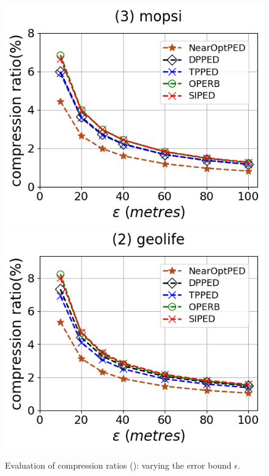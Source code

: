 \begin{figure}[tb!]
	\includegraphics[scale=0.315]{Figures/Exp-PED-CR-epsilon-mopsi.png}		\hspace{1ex}
	\includegraphics[scale=0.315]{Figures/Exp-PED-CR-epsilon-geolife.png}
	\vspace{-2.5ex}
	\caption{\small Evaluation of compression ratios (\ped): varying the error bound $\epsilon$.}
	\label{fig:cr-ped}
	\vspace{-.5ex}
\end{figure}


